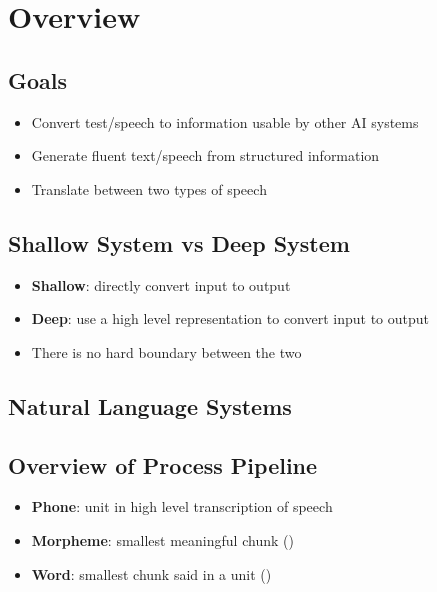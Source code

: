 \section{Overview}

  \subsection{Goals}

    \begin{itemize}
      \item Convert test/speech to information usable by other AI systems
      \item Generate fluent text/speech from structured information
      \item Translate between two types of speech
    \end{itemize}

  \subsection{Shallow System vs Deep System}

    \begin{itemize}
      \item \textbf{Shallow}: directly convert input to output
      \item \textbf{Deep}: use a high level representation to convert input
      to output
      \item There is no hard boundary between the two
    \end{itemize}

  \subsection{Natural Language Systems}

  \subsection{Overview of Process Pipeline}

    \begin{itemize}
      \item \textbf{Phone}: unit in high level transcription of speech
      \item \textbf{Morpheme}: smallest meaningful chunk ()
      \item \textbf{Word}: smallest chunk said in a unit ()
    \end{itemize}

